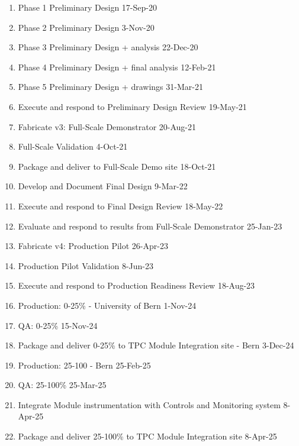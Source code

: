 \begin{enumerate}
\item Phase 1 Preliminary Design 17-Sep-20
\item Phase 2 Preliminary Design 3-Nov-20
\item Phase 3 Preliminary Design + analysis 22-Dec-20
\item Phase 4 Preliminary Design + final analysis 12-Feb-21
\item  Phase 5 Preliminary Design + drawings 31-Mar-21
\item  Execute and respond to Preliminary Design Review 19-May-21
\item Fabricate v3: Full-Scale Demonstrator 20-Aug-21
\item Full-Scale Validation 4-Oct-21
\item  Package and deliver to Full-Scale Demo site 18-Oct-21
\item  Develop and Document Final Design 9-Mar-22
\item  Execute and respond to Final Design Review 18-May-22
\item  Evaluate and respond to results from Full-Scale Demonstrator 25-Jan-23
\item Fabricate v4: Production Pilot 26-Apr-23
\item  Production Pilot Validation 8-Jun-23
\item  Execute and respond to Production Readiness Review 18-Aug-23
\item Production: 0-25\% - University of Bern 1-Nov-24
\item  QA: 0-25\% 15-Nov-24
\item  Package and deliver 0-25\% to TPC Module Integration site - Bern 3-Dec-24
\item Production: 25-100 - Bern 25-Feb-25
\item QA: 25-100\% 25-Mar-25
\item Integrate Module instrumentation with Controls and Monitoring system 8-Apr-25
\item  Package and deliver 25-100\% to TPC Module Integration site 8-Apr-25
\end{enumerate}
  

